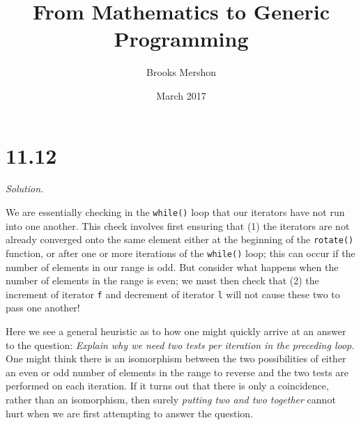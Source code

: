 \documentclass{article}
\title{From Mathematics to Generic Programming}
\author{Brooks Mershon}
\date{March 2017}
\begin{document}
\maketitle

\section*{11.12}

\textit{Solution.}

We are essentially checking in the \texttt{while()} loop that our iterators have not run into one another. This check involves first ensuring that (1) the iterators are not already converged onto the same element either at the beginning of the \texttt{rotate()} function, or after one or more iterations of the \texttt{while()} loop; this can occur if the number of elements in our range is odd. But consider what happens when the number of elements in the range is even; we must then check that (2) the increment of iterator \texttt{f} and decrement of iterator \texttt{l} will not cause these two to pass one another!

Here we see a general heuristic as to how one might quickly arrive at an answer to the question: \textit{Explain why we need two tests per iteration in the preceding  loop.} One might think there is an isomorphism between the two possibilities of either an even or odd number of elements in the range to reverse and the two tests are performed on each iteration. If it turns out that there is only a coincidence, rather than an isomorphism, then surely \textit{putting two and two together} cannot hurt when we are first attempting to answer the question.
\end{document}
